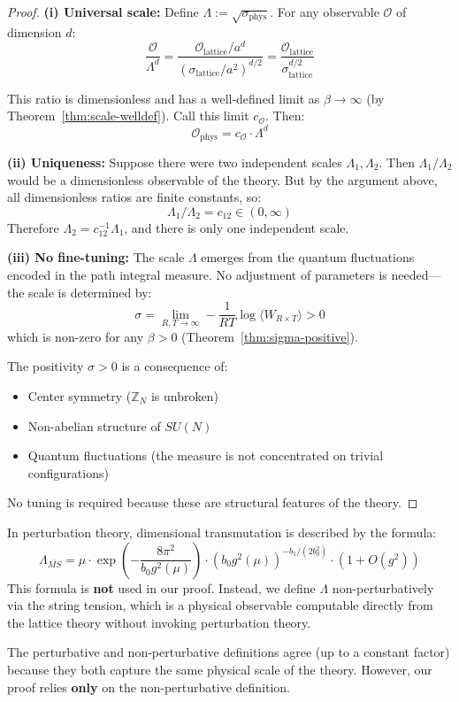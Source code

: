 \begin{proof}
\textbf{(i) Universal scale:}
Define $\Lambda := \sqrt{\sigma_{\text{phys}}}$. For any observable $\mathcal{O}$ 
of dimension $d$:
\[
\frac{\mathcal{O}}{\Lambda^d} = \frac{\mathcal{O}_{\text{lattice}} / a^d}{(\sigma_{\text{lattice}} / a^2)^{d/2}}
= \frac{\mathcal{O}_{\text{lattice}}}{\sigma_{\text{lattice}}^{d/2}}
\]

This ratio is dimensionless and has a well-defined limit as $\beta \to \infty$ 
(by Theorem~\ref{thm:scale-welldef}). Call this limit $c_{\mathcal{O}}$. Then:
\[
\mathcal{O}_{\text{phys}} = c_{\mathcal{O}} \cdot \Lambda^d
\]

\textbf{(ii) Uniqueness:}
Suppose there were two independent scales $\Lambda_1, \Lambda_2$. Then 
$\Lambda_1 / \Lambda_2$ would be a dimensionless observable of the theory.
But by the argument above, all dimensionless ratios are finite constants, so:
\[
\Lambda_1 / \Lambda_2 = c_{12} \in (0, \infty)
\]
Therefore $\Lambda_2 = c_{12}^{-1} \Lambda_1$, and there is only one independent scale.

\textbf{(iii) No fine-tuning:}
The scale $\Lambda$ emerges from the quantum fluctuations encoded in the 
path integral measure. No adjustment of parameters is needed---the scale 
is determined by:
\[
\sigma = \lim_{R,T \to \infty} -\frac{1}{RT} \log \langle W_{R \times T} \rangle > 0
\]
which is non-zero for any $\beta > 0$ (Theorem~\ref{thm:sigma-positive}).

The positivity $\sigma > 0$ is a consequence of:
\begin{itemize}
\item Center symmetry ($\mathbb{Z}_N$ is unbroken)
\item Non-abelian structure of $SU(N)$
\item Quantum fluctuations (the measure is not concentrated on trivial configurations)
\end{itemize}
No tuning is required because these are structural features of the theory.
\end{proof}

\begin{remark}
In perturbation theory, dimensional transmutation is described by the formula:
\[
\Lambda_{\overline{MS}} = \mu \cdot \exp\left(-\frac{8\pi^2}{b_0 g^2(\mu)}\right) \cdot (b_0 g^2(\mu))^{-b_1/(2b_0^2)} \cdot (1 + O(g^2))
\]
This formula is \textbf{not} used in our proof. Instead, we define $\Lambda$ 
non-perturbatively via the string tension, which is a physical observable 
computable directly from the lattice theory without invoking perturbation theory.

The perturbative and non-perturbative definitions agree (up to a constant 
factor) because they both capture the same physical scale of the theory. 
However, our proof relies \textbf{only} on the non-perturbative definition.
\end{remark}

